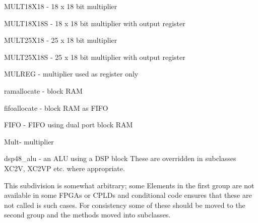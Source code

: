\blist
\item   MULT18X18 - 18 x 18 bit multiplier
\item   MULT18X18S - 18 x 18 bit multiplier with output register
\item   MULT25X18 - 25 x 18 bit multiplier
\item   MULT25X18S - 25 x 18 bit multiplier with output register
\item   MULREG - multiplier used as register only
\item   ramallocate - block RAM
\item   fifoallocate - block RAM as FIFO
\item   FIFO - FIFO using dual port block RAM
\item   Mult- multiplier
\item   dsp48\_alu - an ALU using a DSP block
\blend
These are overridden in subclasses XC2V, XC2VP etc. where appropriate.

This subdivision is somewhat arbitrary; some Elements in the first
group are not available in some FPGAs or CPLDs and conditional code
ensures that these are not called is such cases. For consistency some
of these should be moved to the second group and the methods moved
into subclasses.

